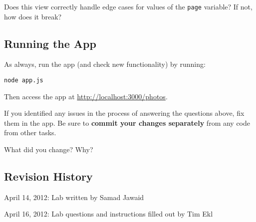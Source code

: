 \documentclass{article}
\begin{document}
 Does this view correctly handle edge cases for values of the \verb!page! variable? If not, how does it break?

\subsection*{Running the App}

As always, run the app (and check new functionality) by running:

\verb!node app.js!

Then access the app at \href{http://localhost:3000/photos}{http://localhost:3000/photos}.


If you identified any issues in the process of answering the questions above, fix them in the app. Be sure to \textbf{commit your changes separately} from any code from other tasks.

 What did you change? Why?



\subsection*{Revision History}
\begin{itemize*}
\item April 14, 2012: Lab written by Samad Jawaid
\item April 16, 2012: Lab questions and instructions filled out by Tim Ekl
\end{itemize*}
\end{document}
